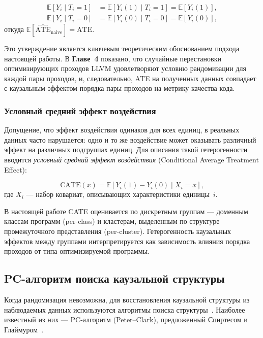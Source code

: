 \begin{align}
    \mathbb{E}[Y_i \mid T_i = 1] &= \mathbb{E}[Y_i(1) \mid T_i = 1] = \mathbb{E}[Y_i(1)], \\
    \mathbb{E}[Y_i \mid T_i = 0] &= \mathbb{E}[Y_i(0) \mid T_i = 0] = \mathbb{E}[Y_i(0)],
\end{align}
откуда $\mathbb{E}[\widehat{\mathrm{ATE}}_{\text{naive}}] = \mathrm{ATE}$.

Это утверждение является ключевым теоретическим обоснованием подхода настоящей работы. В \textbf{Главе~4} показано, что случайные перестановки оптимизирующих проходов LLVM удовлетворяют условию рандомизации для каждой пары проходов, и, следовательно, ATE на полученных данных совпадает с каузальным эффектом порядка пары проходов на метрику качества кода.

\subsubsection{Условный средний эффект воздействия}

Допущение, что эффект воздействия одинаков для всех единиц, в реальных данных часто нарушается: одно и то же воздействие может оказывать различный эффект на различных подгруппах единиц. Для описания такой гетерогенности вводится \emph{условный средний эффект воздействия} (Conditional Average Treatment Effect):

\begin{equation}
    \mathrm{CATE}(x) = \mathbb{E}[Y_i(1) - Y_i(0) \mid X_i = x],
\end{equation}
где $X_i$ --- набор ковариат, описывающих характеристики единицы~$i$.

В настоящей работе CATE оценивается по дискретным группам --- доменным классам программ (per-class) и кластерам, выделенным по структуре промежуточного представления (per-cluster). Гетерогенность каузальных эффектов между группами интерпретируется как зависимость влияния порядка проходов от типа оптимизируемой программы.

\subsection{PC-алгоритм поиска каузальной структуры}

Когда рандомизация невозможна, для восстановления каузальной структуры из наблюдаемых данных используются алгоритмы поиска структуры~\cite{spirtes2000causation, nogueira2022methods}. Наиболее известный из них --- PC-алгоритм (Peter--Clark), предложенный Спиртесом и Глаймуром~\cite{spirtes2000causation}.


